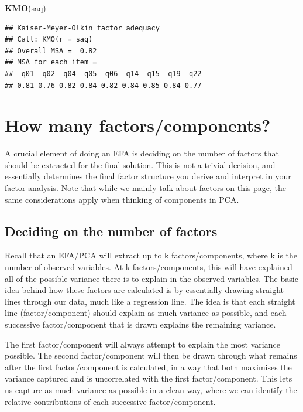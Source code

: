 \documentclass[
]{book}
\newenvironment{Shaded}{\begin{snugshade}}{\end{snugshade}}
\newcommand{\FunctionTok}[1]{\textcolor[rgb]{0.13,0.29,0.53}{\textbf{#1}}}
\newcommand{\NormalTok}[1]{#1}
\begin{document}
\begin{Shaded}
\begin{Highlighting}[]
\FunctionTok{KMO}\NormalTok{(saq)}
\end{Highlighting}
\end{Shaded}

\begin{verbatim}
## Kaiser-Meyer-Olkin factor adequacy
## Call: KMO(r = saq)
## Overall MSA =  0.82
## MSA for each item = 
##  q01  q02  q04  q05  q06  q14  q15  q19  q22 
## 0.81 0.76 0.82 0.84 0.82 0.84 0.85 0.84 0.77
\end{verbatim}

\section{How many factors/components?}\label{how-many-factorscomponents}

A crucial element of doing an EFA is deciding on the number of factors that should be extracted for the final solution. This is not a trivial decision, and essentially determines the final factor structure you derive and interpret in your factor analysis.
Note that while we mainly talk about factors on this page, the same considerations apply when thinking of components in PCA.

\subsection{Deciding on the number of factors}\label{deciding-on-the-number-of-factors}

Recall that an EFA/PCA will extract up to k factors/components, where k is the number of observed variables. At k factors/components, this will have explained all of the possible variance there is to explain in the observed variables. The basic idea behind how these factors are calculated is by essentially drawing straight lines through our data, much like a regression line. The idea is that each straight line (factor/component) should explain as much variance as possible, and each successive factor/component that is drawn explains the remaining variance.

The first factor/component will always attempt to explain the most variance possible. The second factor/component will then be drawn through what remains after the first factor/component is calculated, in a way that both maximises the variance captured and is uncorrelated with the first factor/component. This lets us capture as much variance as possible in a clean way, where we can identify the relative contributions of each successive factor/component.
\end{document}
